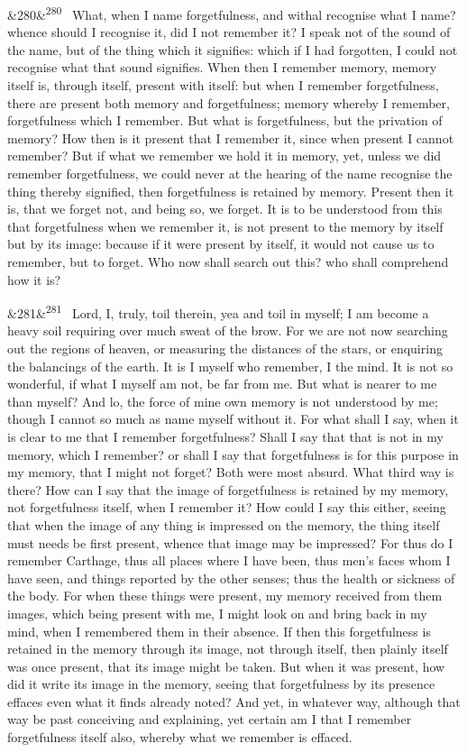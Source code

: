 \documentclass[12pt]{article}
\newcommand{\para}[1][]{\par\noindent\ifx&#1&\else\textsuperscript{\footnotesize #1}~\fi}
\begin{document}
\para[280] What, when I name forgetfulness, and withal recognise what I name? whence should I recognise it, did I not remember it? I speak not of the sound of the name, but of the thing which it signifies: which if I had forgotten, I could not recognise what that sound signifies. When then I remember memory, memory itself is, through itself, present with itself: but when I remember forgetfulness, there are present both memory and forgetfulness; memory whereby I remember, forgetfulness which I remember. But what is forgetfulness, but the privation of memory? How then is it present that I remember it, since when present I cannot remember? But if what we remember we hold it in memory, yet, unless we did remember forgetfulness, we could never at the hearing of the name recognise the thing thereby signified, then forgetfulness is retained by memory. Present then it is, that we forget not, and being so, we forget. It is to be understood from this that forgetfulness when we remember it, is not present to the memory by itself but by its image: because if it were present by itself, it would not cause us to remember, but to forget. Who now shall search out this? who shall comprehend how it is?

\para[281] Lord, I, truly, toil therein, yea and toil in myself; I am become a heavy soil requiring over much sweat of the brow. For we are not now searching out the regions of heaven, or measuring the distances of the stars, or enquiring the balancings of the earth. It is I myself who remember, I the mind. It is not so wonderful, if what I myself am not, be far from me. But what is nearer to me than myself? And lo, the force of mine own memory is not understood by me; though I cannot so much as name myself without it. For what shall I say, when it is clear to me that I remember forgetfulness? Shall I say that that is not in my memory, which I remember? or shall I say that forgetfulness is for this purpose in my memory, that I might not forget? Both were most absurd. What third way is there? How can I say that the image of forgetfulness is retained by my memory, not forgetfulness itself, when I remember it? How could I say this either, seeing that when the image of any thing is impressed on the memory, the thing itself must needs be first present, whence that image may be impressed? For thus do I remember Carthage, thus all places where I have been, thus men's faces whom I have seen, and things reported by the other senses; thus the health or sickness of the body. For when these things were present, my memory received from them images, which being present with me, I might look on and bring back in my mind, when I remembered them in their absence. If then this forgetfulness is retained in the memory through its image, not through itself, then plainly itself was once present, that its image might be taken. But when it was present, how did it write its image in the memory, seeing that forgetfulness by its presence effaces even what it finds already noted? And yet, in whatever way, although that way be past conceiving and explaining, yet certain am I that I remember forgetfulness itself also, whereby what we remember is effaced.
\end{document}
